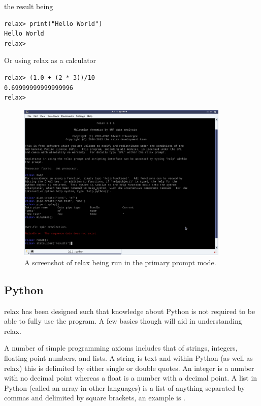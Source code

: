 the result being

\begin{lstlisting}[numbers=none]
relax> print("Hello World")
Hello World
relax>
\end{lstlisting}

Or using relax as a calculator

\begin{lstlisting}[numbers=none]
relax> (1.0 + (2 * 3))/10
0.69999999999999996
relax>
\end{lstlisting}

\begin{figure}
\centerline{\includegraphics[width=0.9\textwidth, bb=14 14 1088 821]{graphics/screenshots/relax_prompt_mode}}
\caption[Prompt screenshot]{A screenshot of relax being run in the primary prompt mode.}\label{fig: relax prompt}
\end{figure}




\subsection{Python}

relax has been designed such that knowledge about Python is not required to be able to fully use the program.  A few basics though will aid in understanding relax.

A number of simple programming axioms includes that of strings, integers, floating point numbers, and lists.  A string is text and within Python (as well as relax) this is delimited by either single or double quotes.  An integer is a number with no decimal point whereas a float is a number with a decimal point.  A list in Python (called an array in other languages) is a list of anything separated by commas and delimited by square brackets, an example is \prompt{[0, 1, 2, `a', 1.2143235]}.

